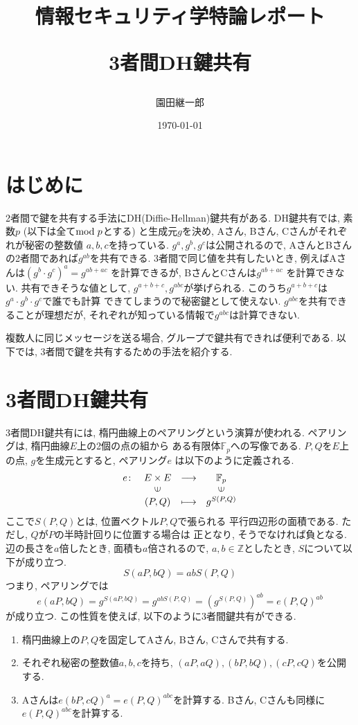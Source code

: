 \documentclass[a4paper,11pt]{jsarticle}
\begin{document}
\title{{\Large 情報セキュリティ学特論レポート}

3者間DH鍵共有}
\author{園田継一郎}
\date{\today}
\maketitle

\section{はじめに}
2者間で鍵を共有する手法にDH(Diffie-Hellman)鍵共有がある.
DH鍵共有では, 素数$p$ (以下は全て${\rm mod}\hspace{3pt} p$とする)
と生成元$g$を決め, 
Aさん, Bさん, Cさんがそれぞれが秘密の整数値
$a, b, c$を持っている.
$g^a, g^b, g^c$は公開されるので, 
AさんとBさんの2者間であれば$g^{ab}$を共有できる.
3者間で同じ値を共有したいとき,
例えばAさんは$(g^b \cdot g^c)^a = g^{ab + ac}$
を計算できるが, BさんとCさんは$g^{ab + ac}$
を計算できない.
共有できそうな値として, $g^{a + b + c}, g^{abc}$が挙げられる.
このうち$g^{a + b + c}$は$g^a \cdot g^b \cdot g^c$で誰でも計算
できてしまうので秘密鍵として使えない.
$g^{abc}$を共有できることが理想だが, 
それぞれが知っている情報で$g^{abc}$は計算できない.

複数人に同じメッセージを送る場合,
グループで鍵共有できれば便利である.
以下では, 3者間で鍵を共有するための手法を紹介する.

\section{3者間DH鍵共有}
3者間DH鍵共有には, 楕円曲線上のペアリングという演算が使われる.
ペアリングは, 楕円曲線$E$上の2個の点の組から
ある有限体$\mathbb{F}_p$への写像である\cite[p.80]{bib1}.
$P, Q$を$E$上の点, $g$を生成元とすると, ペアリング$e$
は以下のように定義される.
\[
  \begin{array}{rccc}
    e \colon & E \times E & \longrightarrow & \mathbb{F}_p \\
            & \rotatebox{90}{$\in$} & & \rotatebox{90}{$\in$} \\
            & (P, Q) & \longmapsto & g^{S(P, Q)}
  \end{array}
\]
ここで$S(P, Q)$とは, 位置ベクトル$P, Q$で張られる
平行四辺形の面積である. ただし, $Q$が$P$の半時計回りに位置する場合は
正となり, そうでなければ負となる. 辺の長さを$a$倍したとき, 
面積も$a$倍されるので, $a, b \in \mathbb{Z}$としたとき, 
$S$について以下が成り立つ. 
\[
  S(aP, bQ) = abS(P, Q)
\]
つまり, ペアリングでは
\[
  e(aP, bQ) = g^{S(aP, bQ)} = g^{abS(P, Q)} =
  \left(g^{S(P, Q)}\right)^{ab} = e(P, Q)^{ab}
\]
が成り立つ. この性質を使えば, 以下のように3者間鍵共有ができる.
\begin{enumerate}
  \item 楕円曲線上の$P, Q$を固定してAさん, Bさん, Cさんで共有する.
  \item それぞれ秘密の整数値$a, b, c$を持ち, $(aP, aQ), (bP, bQ), (cP, cQ)$を公開する.
  \item Aさんは$e(bP, cQ)^a = e(P, Q)^{abc}$を計算する.
    Bさん, Cさんも同様に$e(P, Q)^{abc}$を計算する.
\end{enumerate}
\end{document}

